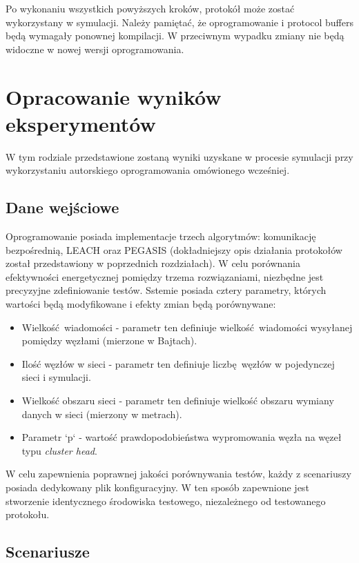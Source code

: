 \documentclass[a4paper,12pt,twoside,openany]{report}
\begin{document}
Po wykonaniu wszystkich powyższych kroków, protokół może zostać wykorzystany w symulacji.
Należy pamiętać, że oprogramowanie i protocol buffers będą wymagały ponownej kompilacji. W przeciwnym wypadku zmiany nie będą widoczne w nowej wersji oprogramowania.

\chapter{Opracowanie wyników eksperymentów}

W tym rodziale przedstawione zostaną wyniki uzyskane w procesie symulacji przy wykorzystaniu autorskiego oprogramowania omówionego wcześniej.

\section{Dane wejściowe}

Oprogramowanie posiada implementacje trzech algorytmów: komunikację bezpośrednią, LEACH oraz PEGASIS (dokładniejszy opis działania protokołów został przedstawiony w poprzednich rozdziałach).
W celu porównania efektywności energetycznej pomiędzy trzema rozwiązaniami, niezbędne jest precyzyjne zdefiniowanie testów.
Sstemie posiada cztery parametry, których wartości będą modyfikowane i efekty zmian będą porównywane:

\begin{itemize}
 \item Wielkość wiadomości - parametr ten definiuje wielkość wiadomości wysyłanej pomiędzy węzłami (mierzone w Bajtach).
 \item Ilość węzłów w sieci - parametr ten definiuje liczbę węzłów w pojedynczej sieci i symulacji.
 \item Wielkość obszaru sieci - parametr ten definiuje wielkość obszaru wymiany danych w sieci (mierzony w metrach).
 \item Parametr `p` - wartość prawdopodobieństwa wypromowania węzła na węzeł typu \textit{cluster head}.
\end{itemize}

W celu zapewnienia poprawnej jakości porównywania testów, każdy z scenariuszy posiada dedykowany plik konfiguracyjny.
W ten sposób zapewnione jest stworzenie identycznego środowiska testowego, niezależnego od testowanego protokołu.

\section{Scenariusze}
\end{document}
